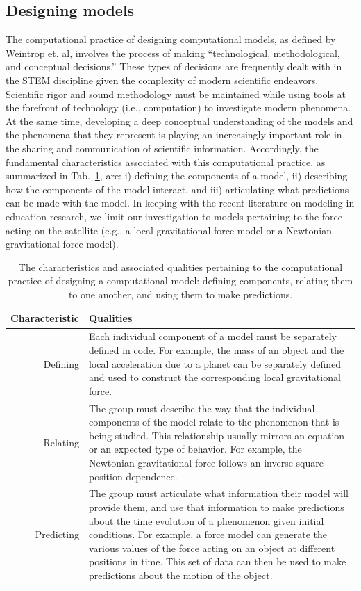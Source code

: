 \documentclass{msuphddissertation}
\begin{document}
\begin{doublespace}
\subsection{Designing models}\label{CH5:SecDesigingModels}

The computational practice of designing computational models, as defined by Weintrop et. al, involves the process of making ``technological, methodological, and conceptual decisions.''  These types of decisions are frequently dealt with in the STEM discipline given the complexity of modern scientific endeavors.  Scientific rigor and sound methodology must be maintained while using tools at the forefront of technology (i.e., computation) to investigate modern phenomena.  At the same time, developing a deep conceptual understanding of the models and the phenomena that they represent is playing an increasingly important role in the sharing and communication of scientific information.  Accordingly, the fundamental characteristics associated with this computational practice, as summarized in Tab.~\ref{CH5:DesigningModels}, are: i) defining the components of a model, ii) describing how the components of the model interact, and iii) articulating what predictions can be made with the model.  In keeping with the recent literature on modeling in education research, we limit our investigation to models pertaining to the force acting on the satellite (e.g., a local gravitational force model or a Newtonian gravitational force model).

\begin{table}
\begin{tabular}{r|p{}}
Characteristic & Qualities \\\hline\hline
Defining & Each individual component of a model must be separately defined in code.  For example, the mass of an object and the local acceleration due to a planet can be separately defined and used to construct the corresponding local gravitational force.\\
Relating & The group must describe the way that the individual components of the model relate to the phenomenon that is being studied.  This relationship usually mirrors an equation or an expected type of behavior.  For example, the Newtonian gravitational force follows an inverse square position-dependence.\\
Predicting & The group must articulate what information their model will provide them, and use that information to make predictions about the time evolution of a phenomenon given initial conditions.  For example, a force model can generate the various values of the force acting on an object at different positions in time.  This set of data can then be used to make predictions about the motion of the object.\\
\end{tabular}\caption{The characteristics and associated qualities pertaining to the computational practice of designing a computational model: defining components, relating them to one another, and using them to make predictions.}\label{CH5:DesigningModels}
\end{table}


\end{doublespace}
\end{document}
